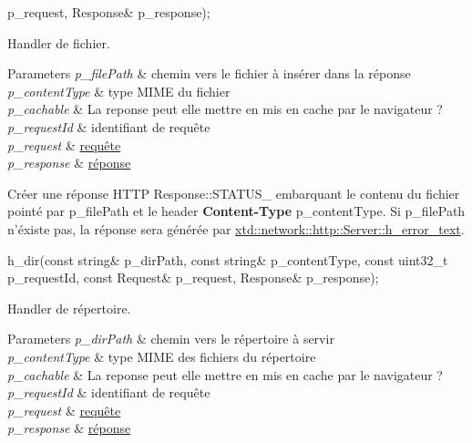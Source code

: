 \begin{DoxyItemize}
\begin{DoxyCode}
      p\_request, Response& p\_response); 
\end{DoxyCode}
 Handler de fichier. 
\begin{DoxyParams}{Parameters}
{\em p\-\_\-file\-Path} & chemin vers le fichier à insérer dans la réponse \\
\hline
{\em p\-\_\-content\-Type} & type M\-I\-M\-E du fichier \\
\hline
{\em p\-\_\-cachable} & La reponse peut elle mettre en mis en cache par le navigateur ? \\
\hline
{\em p\-\_\-request\-Id} & identifiant de requête \\
\hline
{\em p\-\_\-request} & \hyperlink{classxtd_1_1network_1_1http_1_1Request}{requête} \\
\hline
{\em p\-\_\-response} & \hyperlink{classxtd_1_1network_1_1http_1_1Response}{réponse}\\
\hline
\end{DoxyParams}
Créer une réponse H\-T\-T\-P Response\-::\-S\-T\-A\-T\-U\-S\-\_ embarquant le contenu du fichier pointé par p\-\_\-file\-Path et le header {\bfseries Content-\/\-Type} p\-\_\-content\-Type. Si p\-\_\-file\-Path n'éxiste pas, la réponse sera générée par \hyperlink{classxtd_1_1network_1_1http_1_1Server_a39656db929894be1af465c0409c22f35}{xtd\-::network\-::http\-::\-Server\-::h\-\_\-error\-\_\-text}.
\item 
\begin{DoxyCode}
h\_dir(\textcolor{keyword}{const} \textcolor{keywordtype}{string}& p\_dirPath, \textcolor{keyword}{const} \textcolor{keywordtype}{string}& p\_contentType, \textcolor{keyword}{const} uint32\_t p\_requestId, \textcolor{keyword}{const} Request& 
      p\_request, Response& p\_response); 
\end{DoxyCode}
 Handler de répertoire. 
\begin{DoxyParams}{Parameters}
{\em p\-\_\-dir\-Path} & chemin vers le répertoire à servir \\
\hline
{\em p\-\_\-content\-Type} & type M\-I\-M\-E des fichiers du répertoire \\
\hline
{\em p\-\_\-cachable} & La reponse peut elle mettre en mis en cache par le navigateur ? \\
\hline
{\em p\-\_\-request\-Id} & identifiant de requête \\
\hline
{\em p\-\_\-request} & \hyperlink{classxtd_1_1network_1_1http_1_1Request}{requête} \\
\hline
{\em p\-\_\-response} & \hyperlink{classxtd_1_1network_1_1http_1_1Response}{réponse}\\

\end{DoxyParams}
\end{DoxyItemize}
